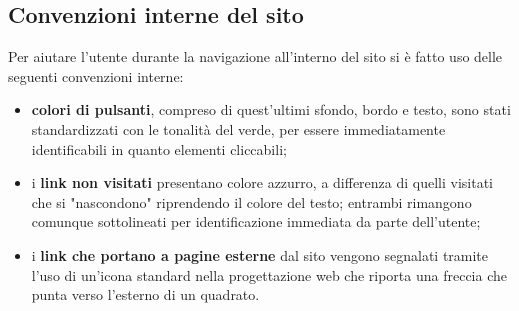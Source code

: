 \documentclass[a4paper,10pt]{article}
\begin{document}
	\subsection{Convenzioni interne del sito}
	Per aiutare l'utente durante la navigazione all'interno del sito si è fatto uso delle seguenti convenzioni interne:
	\begin{itemize}
		\item \textbf{colori di pulsanti}, compreso di quest'ultimi sfondo, bordo e testo, sono stati standardizzati con le tonalità del verde, per essere immediatamente identificabili in quanto elementi cliccabili;
		\item i \textbf{link non visitati} presentano colore azzurro, a differenza di quelli visitati che si "nascondono" riprendendo il colore del testo; entrambi rimangono comunque sottolineati per identificazione immediata da parte dell'utente;
		\item i \textbf{link che portano a pagine esterne} dal sito vengono segnalati tramite l'uso di un'icona standard nella progettazione web che riporta una freccia che punta verso l'esterno di un quadrato.
	\end{itemize}
\end{document}
